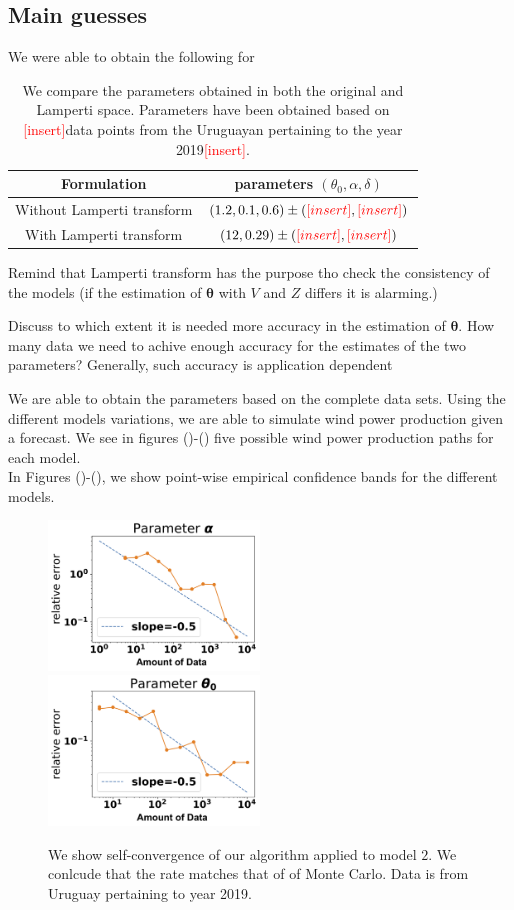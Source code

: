 \documentclass[11pt]{article}
\theoremstyle{definition}
\newcommand{\add}{\textcolor{red}{[insert]}}
\begin{document}
\subsection{Main guesses}

We were able to obtain the following for 
\begin{table}[H]
\centering
\begin{tabular}{|c|c|}
\hline
Formulation   &  parameters $(\theta_0, \alpha,\delta)$    \\ \hline
Without Lamperti transform &   $(1.2,0.1,0.6) \pm (\add , \add) $   \\ \hline
With Lamperti transform &   $(12,0.29) \pm (\add , \add)  $   \\ \hline
\end{tabular}
\caption{We compare the parameters obtained in both the original and Lamperti space. Parameters have been obtained based on \add data points from the Uruguayan pertaining to the year 2019\add .}
\label{tab:model_comparison_2}
\end{table}

{\color{red} Remind that Lamperti transform has the purpose tho check the consistency of the models (if the estimation of $\bm{\theta}$ with $V$ and $Z$ differs it is alarming.)}

{\color{red} Discuss to which extent it is needed more accuracy in the estimation of $\bm{\theta}$. How many data we need to achive enough accuracy for the estimates of the two parameters? Generally, such accuracy is application dependent}

 We are able to obtain the parameters based on the complete data sets. Using the different models variations, we are able to simulate wind power production given a forecast. We see in figures ()-()
five possible wind power production paths for each model.\\

In Figures ()-(), we show point-wise empirical confidence bands for the different models.

\begin{figure}[H]
  \includegraphics[width=56mm,scale=1]{plots/alpha_conv_beta.png}
  \includegraphics[width=56mm,scale=1]{plots/theta_conv_beta.png}
  \caption{We show self-convergence of our algorithm applied to model $2$. We conlcude that the rate  matches that of of Monte Carlo. Data is from Uruguay pertaining to year 2019.}
\end{figure}
\end{document}
